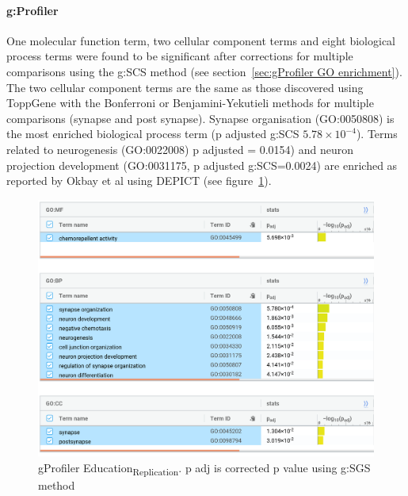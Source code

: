 \paragraph{g:Profiler}

One molecular function term, two cellular component terms and eight biological process terms were found to be significant after corrections for multiple comparisons using the g:SCS method (see section~\ref{sec:gProfiler GO enrichment}). The two cellular component terms are the same as those discovered using ToppGene with the Bonferroni or Benjamini-Yekutieli methods for multiple comparisons (synapse and post synapse). Synapse organisation (GO:0050808) is the most enriched biological process term (p adjusted g:SCS $5.78\times10^{-4}$). Terms related to neurogenesis (GO:0022008) p adjusted = 0.0154) and neuron projection development (GO:0031175, p adjusted g:SCS=0.0024) are enriched as reported by Okbay et al\cite{okbay2016genome} using DEPICT (see figure~\ref{fig:gProfiler EA2}).



\begin{figure}
    \centering
    \includegraphics[width=\textwidth]{images/gprofiler/all_terms/ea2_all_terms.png}
    \caption{gProfiler Education\textsubscript{Replication}. p adj is corrected p value using g:SGS method}
    \label{fig:gProfiler EA2}
\end{figure}






